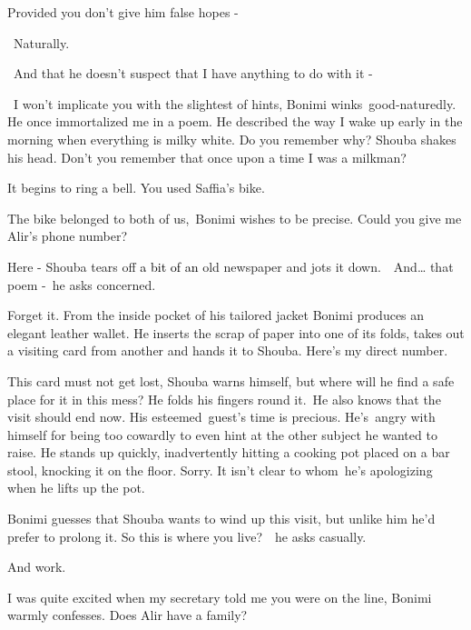 \documentclass[letterpaper]{article}
\begin{document}
{\textquotedbl}Provided you don't give him false hopes -{\textquotedbl}

~{\textquotedbl}Naturally.{\textquotedbl}

~{\textquotedbl}And that he doesn't suspect that I have anything to do with it -{\textquotedbl}

~{\textquotedbl}I won't implicate you with the slightest of hints,{\textquotedbl} Bonimi winks\ good-naturedly.
{\textquotedbl}He once immortalized me in a poem. He described the way I wake up early in the morning when everything
is milky white. Do you remember why?{\textquotedbl} Shouba shakes his head. {\textquotedbl}Don't you remember that once
upon a time I was a milkman?{\textquotedbl}

{\textquotedbl}It begins to ring a bell. You used Saffia's bike.{\textquotedbl}

{\textquotedbl}The bike belonged to both of us,{\textquotedbl}\ Bonimi wishes to be precise. {\textquotedbl}Could you
give me Alir's phone number?{\textquotedbl}

{\textquotedbl}Here -{\textquotedbl} Shouba tears off \textcolor{black}{a bit of an }old newspaper and jots it
down.\ \ {\textquotedbl}And{\dots} that poem -{\textquotedbl}\ he asks concerned.

{\textquotedbl}Forget it.{\textquotedbl} From the inside pocket of his tailored jacket Bonimi produces an elegant
leather wallet. He inserts the scrap of paper into one of its folds, takes out a visiting card from another and hands
it to Shouba. {\textquotedbl}Here's my direct number.{\textquotedbl}

This card must not get lost, Shouba warns himself, but where will he find a safe place for it in this mess? He folds his
fingers round it.\ He also knows that the visit should end now. His esteemed~guest's time is precious.
He's\textcolor[rgb]{0.0,0.4392157,0.7529412}{\ }angry with himself for being too cowardly to even hint at the other
subject he wanted to raise. He stands up quickly, inadvertently hitting a cooking pot placed on a bar stool, knocking
it on the floor. {\textquotedbl}Sorry.{\textquotedbl} It isn't clear to whom\ he's apologizing when he lifts up the
pot.

Bonimi guesses that Shouba wants to wind up this visit, but unlike him he'd prefer to prolong it. {\textquotedbl}So this
is where you live?{\textquotedbl}\ \ he asks casually. 

{\textquotedbl}And work.{\textquotedbl}

{\textquotedbl}I was quite excited when my secretary told me you were on the line,{\textquotedbl} Bonimi warmly
confesses. {\textquotedbl}Does Alir have a family?{\textquotedbl}
\end{document}
